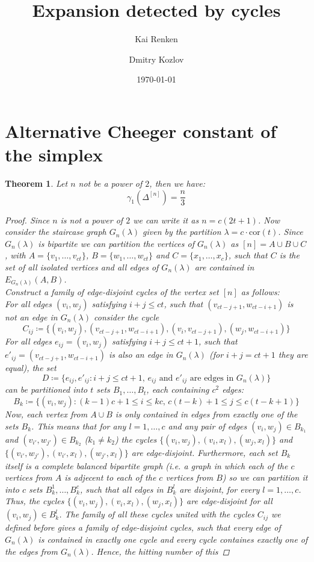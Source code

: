 \documentclass{article}
\title{Expansion detected by cycles}
\author{Kai Renken \and Dmitry Kozlov}
\date{\today}
\newtheorem{thm}{Theorem}[section]
\begin{document}
\maketitle


\begin{abstract}

\end{abstract}

\section{Alternative Cheeger constant of the simplex}

\begin{thm}
Let $n$ not be a power of $2$, then we have:
\[
\gamma_1(\Delta^{[n]})=\frac{n}{3}
\] 
\begin{proof}
Since $n$ is not a power of $2$ we can write it as $n=c(2t+1)$. Now consider the staircase graph $G_n(\lambda)$ given by the partition $\lambda=c\cdot\text{cor}(t)$. Since $G_n(\lambda)$ is bipartite we can partition the vertices of $G_n(\lambda)$ as $[n]=A\cup B\cup C$, with $A=\{v_1,\ldots,v_{ct}\}$, $B=\{w_1,\ldots,w_{ct}\}$ and $C=\{x_1,\ldots,x_c\}$, such that $C$ is the set of all isolated vertices and all edges of $G_n(\lambda)$ are contained in $E_{G_n(\lambda)}(A,B)$.\\
Construct a family of edge-disjoint cycles of the vertex set $[n]$ as follows:\\
For all edges $(v_i,w_j)$ satisfying $i+j\leq ct$, such that $(v_{ct-j+1},w_{ct-i+1})$ is not an edge in $G_n(\lambda)$ consider the cycle
\[
C_{ij}\coloneqq\{(v_i,w_j),(v_{ct-j+1},w_{ct-i+1}),(v_i,v_{ct-j+1}),(w_j,w_{ct-i+1})\}
\]
For all edges $e_{ij}=(v_i,w_j)$ satisfying $i+j\leq ct+1$, such that $e'_{ij}=(v_{ct-j+1},w_{ct-i+1})$ is also an edge in $G_n(\lambda)$ (for $i+j=ct+1$ they are equal), the set
\[
D\coloneqq\{e_{ij}, e'_{ij}:i+j\leq ct+1\text{, }e_{ij}\text{ and }e'_{ij}\text{ are edges in }G_n(\lambda)\}
\] can be partitioned into $t$ sets $B_1,\ldots,B_t$, each containing $c^2$ edges:
\[
B_k\coloneqq\{(v_i,w_j):(k-1)c+1\leq i\leq kc\text{, }c(t-k)+1\leq j\leq c(t-k+1)\}
\]
Now, each vertex from $A\cup B$ is only contained in edges from exactly one of the sets $B_k$. This means that for any $l=1,\ldots,c$ and any pair of edges $(v_i,w_j)\in B_{k_1}$ and $(v_{i'},w_{j'})\in B_{k_2}$ ($k_1\neq k_2$) the cycles $\{(v_i,w_j),(v_i,x_l),(w_j,x_l)\}$ and $\{(v_{i'},w_{j'}),(v_{i'},x_l),(w_{j'},x_l)\}$ are edge-disjoint. Furthermore, each set $B_k$ itself is a complete balanced bipartite graph (i.e. a graph in which each of the $c$ vertices from $A$ is adjecent to each of the $c$ vertices from $B$) so we can partition it into $c$ sets $B_k^1,\ldots,B_k^c$, such that all edges in $B_k^l$ are disjoint, for every $l=1,\ldots,c$. Thus, the cycles $\{(v_i,w_j),(v_i,x_l),(w_j,x_l)\}$ are edge-disjoint for all $(v_i,w_j)\in B_k^l$. The family of all these cycles united with the cycles $C_{ij}$ we defined before gives a family of edge-disjoint cycles, such that every edge of $G_n(\lambda)$ is contained in exactly one cycle and every cycle containes exactly one of the edges from $G_n(\lambda)$. Hence, the hitting number of this 
\end{proof}
\end{thm}
\end{document}
